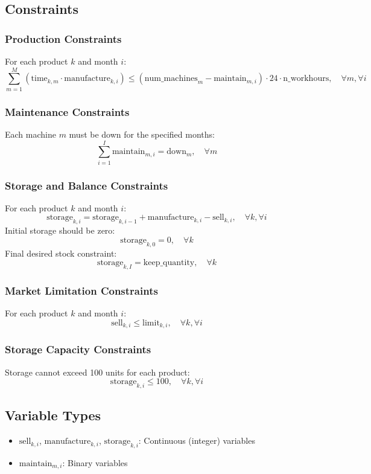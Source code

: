 \documentclass{article}
\begin{document}
\subsection*{Constraints}

\subsubsection*{Production Constraints}
For each product $k$ and month $i$:
\[
\sum_{m=1}^{M} \left( \text{time}_{k,m} \cdot \text{manufacture}_{k,i} \right) \leq \left( \text{num\_machines}_m - \text{maintain}_{m,i} \right) \cdot 24 \cdot \text{n\_workhours}, \quad \forall m, \forall i
\]

\subsubsection*{Maintenance Constraints}
Each machine $m$ must be down for the specified months:
\[
\sum_{i=1}^{I} \text{maintain}_{m,i} = \text{down}_m, \quad \forall m
\]

\subsubsection*{Storage and Balance Constraints}
For each product $k$ and month $i$:
\[
\text{storage}_{k,i} = \text{storage}_{k,i-1} + \text{manufacture}_{k,i} - \text{sell}_{k,i}, \quad \forall k, \forall i
\]
Initial storage should be zero:
\[
\text{storage}_{k,0} = 0, \quad \forall k
\]
Final desired stock constraint:
\[
\text{storage}_{k,I} = \text{keep\_quantity}, \quad \forall k
\]

\subsubsection*{Market Limitation Constraints}
For each product $k$ and month $i$:
\[
\text{sell}_{k,i} \leq \text{limit}_{k,i}, \quad \forall k, \forall i
\]

\subsubsection*{Storage Capacity Constraints}
Storage cannot exceed 100 units for each product:
\[
\text{storage}_{k,i} \leq 100, \quad \forall k, \forall i
\]

\subsection*{Variable Types}
\begin{itemize}
    \item $\text{sell}_{k,i}$, $\text{manufacture}_{k,i}$, $\text{storage}_{k,i}$: Continuous (integer) variables
    \item $\text{maintain}_{m,i}$: Binary variables
\end{itemize}
\end{document}
